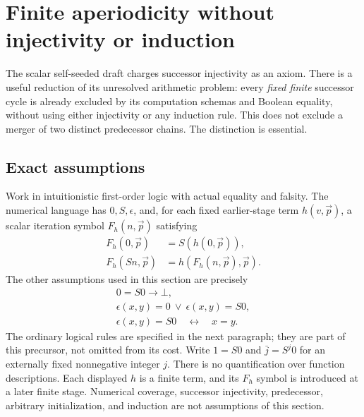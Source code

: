 \section{Finite aperiodicity without injectivity or induction}
\label{sec:finite-aperiodicity}

The scalar self-seeded draft charges successor injectivity as an
axiom.\cite{selfseed}
There is a useful reduction of its unresolved arithmetic problem: every
\emph{fixed finite} successor cycle is already excluded by its computation
schemas and Boolean equality, without using either injectivity or any
induction rule. This does not exclude a merger of two distinct predecessor
chains. The distinction is essential.

\subsection{Exact assumptions}

Work in intuitionistic first-order logic with actual equality and falsity.
The numerical language has $0,S,\epsilon$, and, for each fixed earlier-stage
term $h(v,\vec p)$, a scalar iteration symbol $F_h(n,\vec p)$ satisfying
\begin{align}
 F_h(0,\vec p)&=S(h(0,\vec p)),\label{eq:ac-F0}\\
 F_h(Sn,\vec p)&=h(F_h(n,\vec p),\vec p).
 \label{eq:ac-FS}
\end{align}
The other assumptions used in this section are precisely
\begin{gather}
 0=S0\longrightarrow\bot,\label{eq:ac-sep}\\
 \epsilon(x,y)=0\ \lor\ \epsilon(x,y)=S0,
 \label{eq:ac-range}\\
 \epsilon(x,y)=S0\quad\longleftrightarrow\quad x=y.
 \label{eq:ac-reflection}
\end{gather}
The ordinary logical rules are specified in the next paragraph; they are
part of this precursor, not omitted from its cost. Write $1=S0$ and
$\bar j=S^j0$ for an externally fixed nonnegative integer
$j$. There is no quantification over function descriptions. Each displayed
$h$ is a finite term, and its $F_h$ symbol is introduced at a later finite
stage. Numerical coverage, successor injectivity, predecessor, arbitrary
initialization, and induction are not assumptions of this section.


